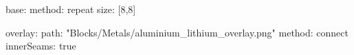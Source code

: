 base:
  method: repeat
  size: [8,8]
  
overlay:
  path: "Blocks/Metals/aluminium_lithium_overlay.png"
  method: connect
  innerSeams: true